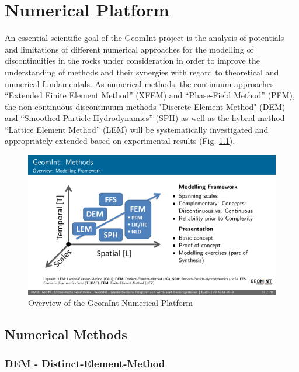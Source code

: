 \chapter{Numerical Platform}
\label{cha:num}
An essential scientific goal of the GeomInt project is the analysis of potentials and limitations of different numerical approaches for the modelling of discontinuities in the rocks under consideration in order to improve the understanding of methods and their synergies with regard to theoretical and numerical fundamentals. As numerical methods, the continuum approaches ``Extended Finite Element Method'' (XFEM) and ``Phase-Field Method'' (PFM), the non-continuous discontinuum methods "Discrete Element Method" (DEM) and ``Smoothed Particle Hydrodynamics'' (SPH) as well as the hybrid method ``Lattice Element Method'' (LEM) will be systematically investigated and appropriately extended based on experimental results (Fig. \ref{fig:num-overview}).
\begin{figure}[ht!]
\centering
\includegraphics[width=1\textwidth]{figures/geomint-mod-overview}
\caption{Overview of the GeomInt Numerical Platform}
\label{fig:num-overview}
\end{figure}

\section{Numerical Methods}


\subsection{DEM - Distinct-Element-Method}


